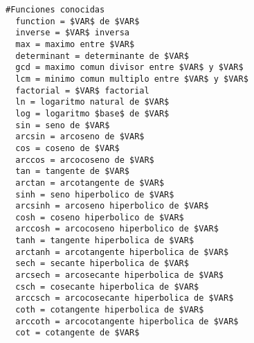 \begin{lstlisting}[basicstyle=\scriptsize]
#Funciones conocidas
  function = $VAR$ de $VAR$
  inverse = $VAR$ inversa
  max = maximo entre $VAR$
  determinant = determinante de $VAR$
  gcd = maximo comun divisor entre $VAR$ y $VAR$
  lcm = minimo comun multiplo entre $VAR$ y $VAR$
  factorial = $VAR$ factorial
  ln = logaritmo natural de $VAR$
  log = logaritmo $base$ de $VAR$
  sin = seno de $VAR$
  arcsin = arcoseno de $VAR$
  cos = coseno de $VAR$
  arccos = arcocoseno de $VAR$
  tan = tangente de $VAR$
  arctan = arcotangente de $VAR$
  sinh = seno hiperbolico de $VAR$
  arcsinh = arcoseno hiperbolico de $VAR$
  cosh = coseno hiperbolico de $VAR$
  arccosh = arcocoseno hiperbolico de $VAR$
  tanh = tangente hiperbolica de $VAR$
  arctanh = arcotangente hiperbolica de $VAR$
  sech = secante hiperbolica de $VAR$
  arcsech = arcosecante hiperbolica de $VAR$
  csch = cosecante hiperbolica de $VAR$
  arccsch = arcocosecante hiperbolica de $VAR$
  coth = cotangente hiperbolica de $VAR$
  arccoth = arcocotangente hiperbolica de $VAR$
  cot = cotangente de $VAR$
\end{lstlisting}

